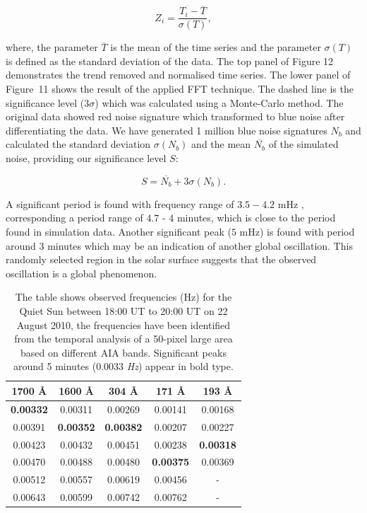 \documentclass[physics,article,submit,pdftex,moreauthors]{Definitions/mdpi}
\begin{document}
\begin{equation}
	Z_{i} = \frac {T_{i} - \overline{T}}  {\sigma(T)},
	\label{z_score}
\end{equation}


where, the parameter $\overline{T}$ is the mean of the time series and the parameter $\sigma(T)$ is defined as the standard deviation of the data. The top panel of Figure 12 demonstrates the trend removed and normalised time series. The lower panel of Figure~11 shows the result of the applied FFT technique. The dashed line is the significance level ($3 \sigma$) which was calculated using a Monte-Carlo method. The original data showed red noise signature which transformed to blue noise after differentiating the data. We have generated 1 million blue noise signatures $N_{b}$ and calculated the standard deviation $\sigma(N_{b})$ and the mean $\overline{N_{b}}$ of the simulated noise, providing our significance level $S$:


\begin{equation}
    S = \overline{N_{b}} + 3 \sigma(N_{b}).
\end{equation}


A significant period is found with frequency range of $3.5-4.2$ mHz , corresponding a period range of $4.7$ - $4$ minutes, which is close to the period found in simulation data. Another significant peak ($5$ mHz) is found with period around $3$ minutes which may be an indication of another global oscillation.  This randomly selected region in the solar surface suggests that the observed oscillation is a global phenomenon.




\begin{table}\label{qsfrequencies}
\centering
\begin{tabular}{c c c c c}
\hline
1700 {\AA}     &  1600 {\AA}   & 304 {\AA}     & 171 {\AA}     & 193 {\AA}    \\
\hline
{\bf 0.00332}  & 0.00311       & 0.00269       &  0.00141      & 0.00168      \\
\hline
0.00391	       & {\bf 0.00352} & {\bf 0.00382} & 0.00207       & 0.00227      \\
\hline
0.00423        & 0.00432	   & 0.00451       & 0.00238	   & {\bf0.00318} \\
\hline
0.00470        & 0.00488       & 0.00480	   & {\bf 0.00375} & 0.00369      \\
\hline
0.00512        & 0.00557       & 0.00619	   & 0.00456       & -            \\
\hline
0.00643	       & 0.00599	   & 0.00742       & 0.00762	   & -            \\

\hline
\end{tabular} 
\caption{The table shows observed frequencies (Hz) for the Quiet Sun between 18:00 UT to 20:00 UT on 22 August 2010, the frequencies have been identified from the temporal analysis of a 50-pixel large area based on different AIA bands. Significant peaks around 5 minutes (0.0033 {\it Hz}) appear in bold type.}
\label{FrequenciesQS}
\end{table}
\end{document}
